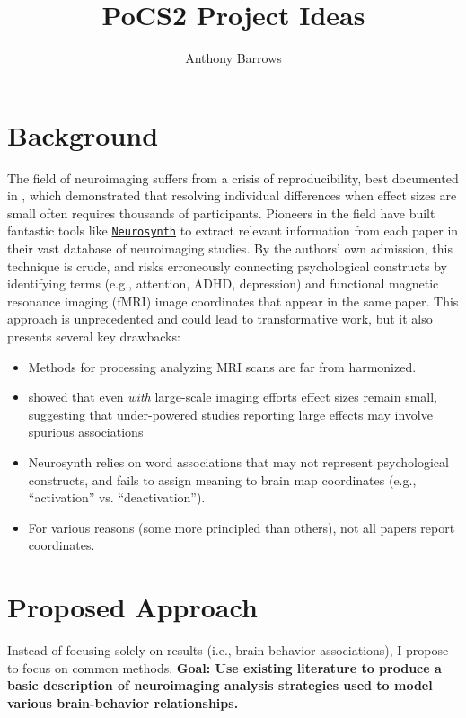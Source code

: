 \documentclass[]{article}
\title{PoCS2 Project Ideas}
\author{Anthony Barrows}
\begin{document}
	
\sffamily

\maketitle


\section{Background}

The field of neuroimaging suffers from a crisis of reproducibility, best documented in \cite{MarekEtAl2022}, which demonstrated that resolving individual differences when effect sizes are small often requires thousands of participants. Pioneers in the field have built fantastic tools like \href{https://neurosynth.org/}{\texttt{Neurosynth}} \cite{YarkoniEtAl2011} to extract relevant information from each paper in their vast database of neuroimaging studies. By the authors' own admission, this technique is crude, and risks erroneously connecting psychological constructs by identifying terms (e.g., attention, ADHD, depression) and functional magnetic resonance imaging (fMRI) image coordinates that appear in the same paper. This approach is unprecedented and could lead to transformative work, but it also presents several key drawbacks:

\begin{itemize}
	\item Methods for processing analyzing MRI scans are far from harmonized.
	\item \cite{owensRecalibratingExpectationsEffect2021} showed that even \textit{with} large-scale imaging efforts effect sizes remain small, suggesting that under-powered studies reporting large effects may involve spurious associations
	\item Neurosynth relies on word associations that may not represent psychological constructs, and fails to assign meaning to brain map coordinates (e.g., ``activation'' vs. ``deactivation''). 
	\item For various reasons (some more principled than others), not all papers report coordinates.
\end{itemize}


\section{Proposed Approach}

Instead of focusing solely on results (i.e., brain-behavior associations), I propose to focus on common methods. \textbf{Goal: Use existing literature to produce a basic description of neuroimaging analysis strategies used to model various brain-behavior relationships.} 
\end{document}
